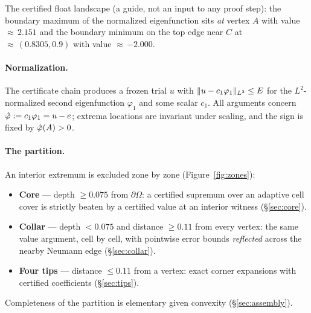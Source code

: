 \documentclass[11pt]{article}
\begin{document}
The certified float landscape (a guide, not an input to any proof step):
the boundary maximum of the normalized eigenfunction sits \emph{at}
vertex $A$ with value ${\approx}\,2.151$ and the boundary minimum on the
top edge near $C$ at ${\approx}\,(0.8305, 0.9)$ with value
${\approx}\,{-2.000}$.

\paragraph{Normalization.}
The certificate chain produces a frozen trial $u$ with
$\lVert u-c_1\varphi_1 \rVert_{L^2}\le E$ for the $L^2$-normalized second
eigenfunction $\varphi_1$ and some scalar $c_1$. All arguments concern
$\hat\varphi:=c_1\varphi_1=u-e$; extrema locations are invariant under scaling,
and the sign is fixed by $\hat\varphi(A)>0$.

\paragraph{The partition.}
An interior extremum is excluded zone by zone (Figure~\ref{fig:zones}):
\begin{itemize}
\item \textbf{Core} --- depth $\ge 0.075$ from $\partial\Omega$: a
certified supremum over an adaptive cell cover is strictly beaten by a
certified value at an interior witness (\S\ref{sec:core}).
\item \textbf{Collar} --- depth $<0.075$ and distance $\ge 0.11$ from
every vertex: the same value argument, cell by cell, with pointwise
error bounds \emph{reflected} across the nearby Neumann edge
(\S\ref{sec:collar}).
\item \textbf{Four tips} --- distance $\le 0.11$ from a vertex: exact
corner expansions with certified coefficients (\S\ref{sec:tips}).
\end{itemize}
Completeness of the partition is elementary given convexity
(\S\ref{sec:assembly}).
\end{document}
